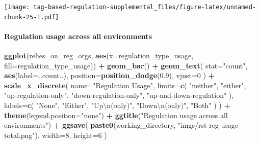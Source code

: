 \documentclass[
]{book}
\newenvironment{Shaded}{\begin{snugshade}}{\end{snugshade}}
\newcommand{\CharTok}[1]{\textcolor[rgb]{0.31,0.60,0.02}{#1}}
\newcommand{\DataTypeTok}[1]{\textcolor[rgb]{0.13,0.29,0.53}{#1}}
\newcommand{\DecValTok}[1]{\textcolor[rgb]{0.00,0.00,0.81}{#1}}
\newcommand{\FloatTok}[1]{\textcolor[rgb]{0.00,0.00,0.81}{#1}}
\newcommand{\KeywordTok}[1]{\textcolor[rgb]{0.13,0.29,0.53}{\textbf{#1}}}
\newcommand{\NormalTok}[1]{#1}
\newcommand{\OperatorTok}[1]{\textcolor[rgb]{0.81,0.36,0.00}{\textbf{#1}}}
\newcommand{\StringTok}[1]{\textcolor[rgb]{0.31,0.60,0.02}{#1}}
\begin{document}
\texttt{[image: tag-based-regulation-supplemental\_files/figure-latex/unnamed-chunk-25-1.pdf]}

\hypertarget{regulation-usage-across-all-environments}{%
\paragraph{Regulation usage across all environments}\label{regulation-usage-across-all-environments}}

\begin{Shaded}
\begin{Highlighting}[]
\KeywordTok{ggplot}\NormalTok{(relies\_on\_reg\_orgs, }\KeywordTok{aes}\NormalTok{(}\DataTypeTok{x=}\NormalTok{regulation\_type\_usage, }\DataTypeTok{fill=}\NormalTok{regulation\_type\_usage)) }\OperatorTok{+}
\StringTok{  }\KeywordTok{geom\_bar}\NormalTok{() }\OperatorTok{+}
\StringTok{  }\KeywordTok{geom\_text}\NormalTok{(}
    \DataTypeTok{stat=}\StringTok{"count"}\NormalTok{,}
    \KeywordTok{aes}\NormalTok{(}\DataTypeTok{label=}\NormalTok{..count..),}
    \DataTypeTok{position=}\KeywordTok{position\_dodge}\NormalTok{(}\FloatTok{0.9}\NormalTok{),}
    \DataTypeTok{vjust=}\DecValTok{0}
\NormalTok{  ) }\OperatorTok{+}
\StringTok{  }\KeywordTok{scale\_x\_discrete}\NormalTok{(}
    \DataTypeTok{name=}\StringTok{"Regulation Usage"}\NormalTok{,}
    \DataTypeTok{limits=}\KeywordTok{c}\NormalTok{(}
      \StringTok{"neither"}\NormalTok{,}
      \StringTok{"either"}\NormalTok{,}
      \StringTok{"up{-}regulation{-}only"}\NormalTok{,}
      \StringTok{"down{-}regulation{-}only"}\NormalTok{,}
      \StringTok{"up{-}and{-}down{-}regulation"}
\NormalTok{    ),}
    \DataTypeTok{labels=}\KeywordTok{c}\NormalTok{(}
      \StringTok{"None"}\NormalTok{,}
      \StringTok{"Either"}\NormalTok{,}
      \StringTok{"Up}\CharTok{\textbackslash{}n}\StringTok{(only)"}\NormalTok{,}
      \StringTok{"Down}\CharTok{\textbackslash{}n}\StringTok{(only)"}\NormalTok{,}
      \StringTok{"Both"}
\NormalTok{    )}
\NormalTok{  ) }\OperatorTok{+}
\StringTok{  }\KeywordTok{theme}\NormalTok{(}\DataTypeTok{legend.position=}\StringTok{"none"}\NormalTok{) }\OperatorTok{+}
\StringTok{  }\KeywordTok{ggtitle}\NormalTok{(}\StringTok{"Regulation usage across all environments"}\NormalTok{) }\OperatorTok{+}
\StringTok{  }\KeywordTok{ggsave}\NormalTok{(}
    \KeywordTok{paste0}\NormalTok{(working\_directory, }\StringTok{"imgs/rst{-}reg{-}usage{-}total.png"}\NormalTok{),}
    \DataTypeTok{width=}\DecValTok{8}\NormalTok{,}
    \DataTypeTok{height=}\DecValTok{6}
\NormalTok{  )}
\end{Highlighting}
\end{Shaded}
\end{document}
